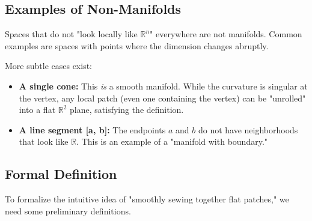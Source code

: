 \documentclass[11pt, a4paper]{report}
\begin{document}
\subsection*{Examples of Non-Manifolds}
Spaces that do not "look locally like $\mathbb{R}^n$" everywhere are not manifolds. Common examples are spaces with points where the dimension changes abruptly.








More subtle cases exist:
\begin{itemize}
    \item \textbf{A single cone:} This \emph{is} a smooth manifold. While the curvature is singular at the vertex, any local patch (even one containing the vertex) can be "unrolled" into a flat $\mathbb{R}^2$ plane, satisfying the definition.
    \item \textbf{A line segment [a, b]:} The endpoints $a$ and $b$ do not have neighborhoods that look like $\mathbb{R}$. This is an example of a "manifold with boundary."
\end{itemize}








\subsection*{Formal Definition}
To formalize the intuitive idea of "smoothly sewing together flat patches," we need some preliminary definitions.
\end{document}
